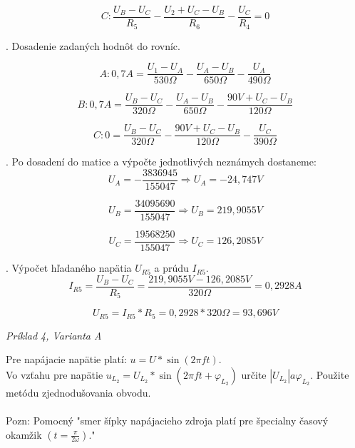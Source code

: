 \documentclass[a4paper,12pt]{article}
\begin{document}
\begin{equation}
C: \frac{U_B - U_C}{R_5} - \frac{U_2 + U_C - U_B}{R_6} - \frac{U_C}{R_4} = 0
\end{equation}


\bigskip
{}. Dosadenie zadaných hodnôt do rovníc.

\begin{equation}
A: 0,7A = \frac{U_1 - U_A}{530\Omega} - \frac{U_A - U_B}{650\Omega} - \frac{U_A}{490\Omega}
\end{equation}

\begin{equation}
B: 0,7A = \frac{U_B - U_C}{320\Omega} - \frac{U_A - U_B}{650\Omega} - \frac{90V + U_C - U_B}{120\Omega}
\end{equation}

\begin{equation}
C: 0 = \frac{U_B - U_C}{320\Omega} - \frac{90V + U_C - U_B}{120\Omega} - \frac{U_C}{390\Omega}
\end{equation}

\bigskip
{}. Po dosadení do matice a výpočte jednotlivých neznámych dostaneme:
\begin{equation}
U_A = -\frac{3836945}{155047} \Rightarrow U_A = -24,747V
\end{equation}

\begin{equation}
U_B = \frac{34095690}{155047} \Rightarrow U_B = 219,9055V
\end{equation}

\begin{equation}
U_C =\frac{19568250}{155047} \Rightarrow U_C = 126,2085V
\end{equation}

\bigskip
{}. Výpočet hľadaného napätia $U_{R5}$ a prúdu $I_{R5}$.
\begin{equation}
I_{R5} = \frac{U_B - U_C}{R_5} = \frac{219,9055V - 126,2085V}{320\Omega} = 0,2928A
\end{equation}

\begin{equation}
U_{R5} = I_{R5} * R_5 = 0,2928 * 320\Omega = 93,696V
\end{equation}


\newpage
\begin{center}
\emph{Príklad 4, Varianta A}
\end{center}

\bigskip
Pre napájacie napätie platí: $u = U * \sin (2\pi ft)$. \\
Vo vzťahu pre napätie  $ u_{L_2} = U_{L_2} * \sin (2\pi ft + \varphi_{L_2})$ určite $|U_{L_2}| a \varphi_{L_2}$. Použite metódu zjednodušovania obvodu. \\
\\
Pozn: Pomocný "smer šípky napájacieho zdroja platí pre špecialny časový okamžik $(t = \frac{\pi}{2\omega})$."
\bigskip
\end{document}
